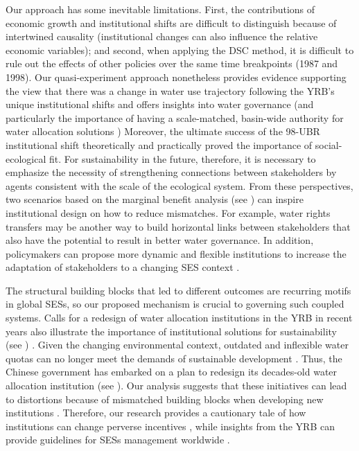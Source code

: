 Our approach has some inevitable limitations.
First, the contributions of economic growth and institutional shifts are difficult to distinguish because of intertwined causality (institutional changes can also influence the relative economic variables);
and second, when applying the DSC method, it is difficult to rule out the effects of other policies over the same time breakpoints (1987 and 1998).
Our quasi-experiment approach nonetheless provides evidence supporting the view that there was a change in water use trajectory following the YRB's unique institutional shifts and offers insights into water governance (and particularly the importance of having a scale-matched, basin-wide authority for water allocation solutions \cite{bodin2017b, ostrom2009, reyers2018})
Moreover, the ultimate success of the 98-UBR institutional shift theoretically and practically proved the importance of social-ecological fit.
For sustainability in the future, therefore, it is necessary to emphasize the necessity of strengthening connections between stakeholders by agents consistent with the scale of the ecological system.
From these perspectives, two scenarios based on the marginal benefit analysis (see \textit{}) can inspire institutional design on how to reduce mismatches.
For example, water rights transfers may be another way to build horizontal links between stakeholders that also have the potential to result in better water governance.
In addition, policymakers can propose more dynamic and flexible institutions to increase the adaptation of stakeholders to a changing SES context \cite{reyers2018}.

The structural building blocks that led to different outcomes are recurring motifs in global SESs, so our proposed mechanism is crucial to governing such coupled systems.
Calls for a redesign of water allocation institutions in the YRB in recent years also illustrate the importance of institutional solutions for sustainability (see \textit{}) \cite{yu2019, niu2022}.
Given the changing environmental context, outdated and inflexible water quotas can no longer meet the demands of sustainable development \cite{wang2019a}.
Thus, the Chinese government has embarked on a plan to redesign its decades-old water allocation institution (see \textit{}).
Our analysis suggests that these initiatives can lead to distortions because of mismatched building blocks when developing new institutions \cite{bodin2017b}.
Therefore, our research provides a cautionary tale of how institutions can change perverse incentives \cite{hegwood2022}, while insights from the YRB can provide guidelines for SESs management worldwide \cite{muneepeerakul2017, leslie2015}.
